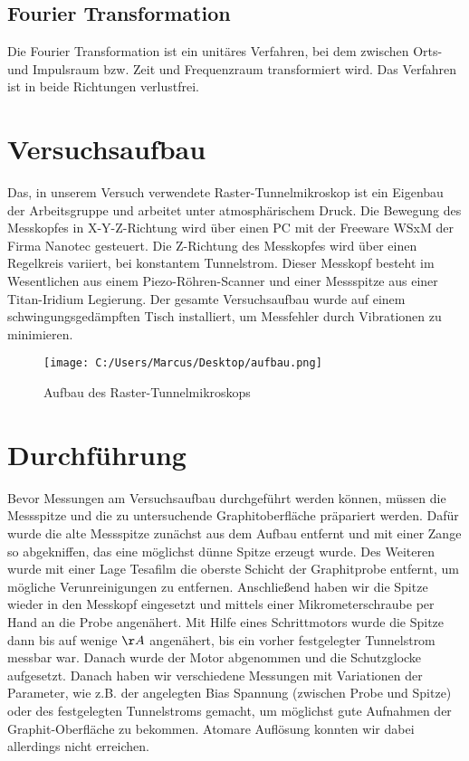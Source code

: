 \documentclass[10pt,a4paper]{article}
\begin{document}
\subsection{	Fourier Transformation}

Die Fourier Transformation ist ein unitäres Verfahren, bei dem zwischen Orts- und Impulsraum bzw. Zeit und Frequenzraum transformiert wird. Das Verfahren ist in beide Richtungen verlustfrei.

\section{	Versuchsaufbau}

Das, in unserem Versuch verwendete Raster-Tunnelmikroskop ist ein Eigenbau der Arbeitsgruppe und arbeitet unter atmosphärischem Druck. Die Bewegung des Messkopfes in X-Y-Z-Richtung wird über einen PC mit der Freeware WSxM der Firma Nanotec gesteuert. Die Z-Richtung des Messkopfes wird über einen Regelkreis variiert, bei konstantem Tunnelstrom. Dieser Messkopf besteht im Wesentlichen aus einem Piezo-Röhren-Scanner und einer Messspitze aus einer Titan-Iridium Legierung. Der gesamte Versuchsaufbau wurde auf einem schwingungsgedämpften Tisch installiert, um Messfehler durch Vibrationen zu minimieren.

\begin{figure}[h]
	\texttt{[image: C:/Users/Marcus/Desktop/aufbau.png]}
	\centering
	\caption{Aufbau des Raster-Tunnelmikroskops}
	\label{diagramm_aufspaltung}
\end{figure}

\section{	Durchführung}

Bevor Messungen am Versuchsaufbau durchgeführt werden können, müssen die Messspitze und die zu untersuchende Graphitoberfläche präpariert werden. Dafür wurde die alte Messspitze zunächst aus dem Aufbau entfernt und mit einer Zange so abgekniffen, das eine möglichst dünne Spitze erzeugt wurde. Des Weiteren wurde mit einer Lage Tesafilm die oberste Schicht der Graphitprobe entfernt, um mögliche Verunreinigungen zu entfernen. Anschließend haben wir die Spitze wieder in den Messkopf eingesetzt und mittels einer Mikrometerschraube per Hand an die Probe angenähert. Mit Hilfe eines Schrittmotors wurde die Spitze dann bis auf wenige $\AA$ angenähert, bis ein vorher festgelegter Tunnelstrom messbar war. Danach wurde der Motor abgenommen und die Schutzglocke aufgesetzt. Danach haben wir verschiedene Messungen mit Variationen der Parameter, wie z.B. der angelegten Bias Spannung (zwischen Probe und Spitze) oder des festgelegten Tunnelstroms gemacht, um möglichst gute Aufnahmen der Graphit-Oberfläche zu bekommen. Atomare Auflösung konnten wir dabei allerdings nicht erreichen.
\end{document}
